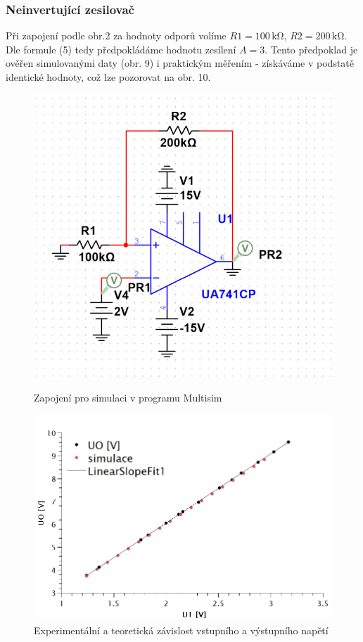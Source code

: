 \documentclass[czech,11pt,a4paper]{article}
\begin{document}
\begin{multicols}{2}
		\subsubsection{Neinvertující zesilovač}
		Při zapojení podle obr.2 za hodnoty odporů volíme $R1=100 \,\mathrm{k\Omega}, \, R2 = 200 \,\mathrm{k\Omega}$. Dle formule (5) tedy předpokládáme hodnotu zesílení $A=3$. Tento předpoklad je ověřen simulovanými daty (obr. 9) i praktickým měřením - získáváme v podstatě identické hodnoty, což lze pozorovat na obr. 10.
		
		\begin{figure}[H]
			\centering
			
			\includegraphics[width=0.8\linewidth]{MSneinv}
			\caption{Zapojení pro simulaci v programu Multisim}
			\includegraphics[width=0.8\linewidth]{neinvvys}
			\caption{Experimentální a teoretická závislost vstupního a výstupního napětí}
		\end{figure}
		

\end{multicols}
\end{document}
